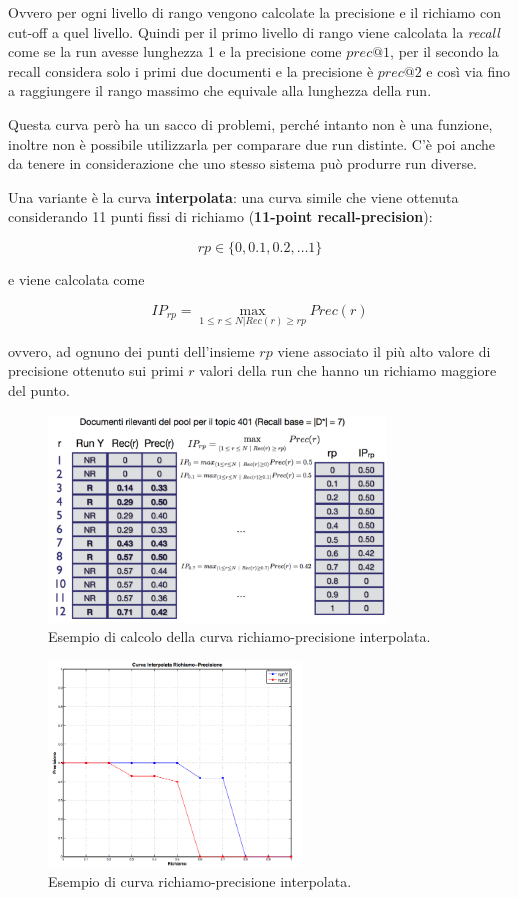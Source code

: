 Ovvero per ogni livello di rango vengono calcolate la precisione e il richiamo con cut-off a quel livello.
Quindi per il primo livello di rango viene calcolata la \textit{recall} come se la run avesse lunghezza 1 e la precisione come $prec@1$, per il secondo la recall considera solo i primi due documenti e la precisione è $prec@2$ e così via fino a raggiungere il rango massimo che equivale alla lunghezza della run.

Questa curva però ha un sacco di problemi, perché intanto non è una funzione, inoltre non è possibile utilizzarla per comparare due run distinte. C'è poi anche da tenere in considerazione che uno stesso sistema può produrre run diverse.

Una variante è la curva \textbf{interpolata}: una curva simile che viene ottenuta considerando 11 punti fissi di richiamo (\textbf{11-point recall-precision}):

$$
rp \in \{ 0, 0.1, 0.2, \ldots 1 \}
$$

e viene calcolata come 

$$
IP_{rp} = \max_{1 \leq r \leq N | Rec(r) \geq rp} Prec(r)
$$

ovvero, ad ognuno dei punti dell'insieme $rp$ viene associato il più alto valore di precisione ottenuto sui primi $r$ valori della run che hanno un richiamo maggiore del punto.

\begin{figure}[htbp]
	\centering
	\includegraphics[width=0.8\textwidth]{images/l15-fig-5.png}
	\caption{Esempio di calcolo della curva richiamo-precisione interpolata.}
\end{figure}

\begin{figure}[htbp]
	\centering
	\includegraphics[width=0.6\textwidth]{images/l15-fig-6.png}
	\caption{Esempio di curva richiamo-precisione interpolata.}
\end{figure}

